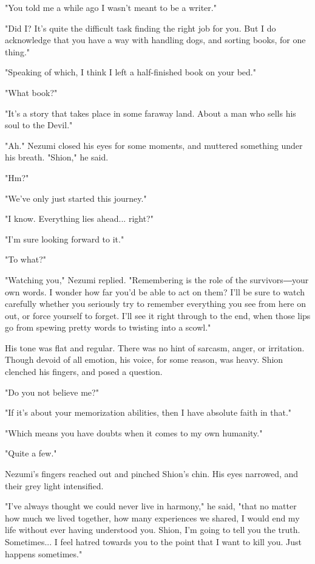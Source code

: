 "You told me a while ago I wasn't meant to be a writer."

"Did I? It's quite the difficult task finding the right job for you. But
I do acknowledge that you have a way with handling dogs, and sorting
books, for one thing."

"Speaking of which, I think I left a half-finished book on your bed."

"What book?"

"It's a story that takes place in some faraway land. About a man who
sells his soul to the Devil."

"Ah." Nezumi closed his eyes for some moments, and muttered something
under his breath. "Shion," he said.

"Hm?"

"We've only just started this journey."

"I know. Everything lies ahead... right?"

"I'm sure looking forward to it."

"To what?"

"Watching you," Nezumi replied. "Remembering is the role of the
survivors―your own words. I wonder how far you'd be able to act on them?
I'll be sure to watch carefully whether you seriously try to remember
everything you see from here on out, or force yourself to forget. I'll
see it right through to the end, when those lips go from spewing pretty
words to twisting into a scowl."

His tone was flat and regular. There was no hint of sarcasm, anger, or
irritation. Though devoid of all emotion, his voice, for some reason,
was heavy. Shion clenched his fingers, and posed a question.

"Do you not believe me?"

"If it's about your memorization abilities, then I have absolute faith
in that."

"Which means you have doubts when it comes to my own humanity."

"Quite a few."

Nezumi's fingers reached out and pinched Shion's chin. His eyes
narrowed, and their grey light intensified.

"I've always thought we could never live in harmony," he said, "that no
matter how much we lived together, how many experiences we shared, I
would end my life without ever having understood you. Shion, I'm going
to tell you the truth. Sometimes... I feel hatred towards you to the
point that I want to kill you. Just happens sometimes."

